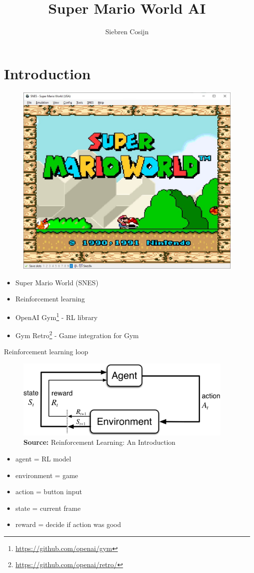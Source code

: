 \documentclass{article}
\title{Super Mario World AI}
\author{Siebren Cosijn}
\begin{document}
    \maketitle

    \section{Introduction}
    \begin{figure}[H]
        \centering
        \includegraphics[width=.85\textwidth]{start-screen}
    \end{figure}
    \begin{itemize}
        \item Super Mario World (SNES)
        \item Reinforcement learning
        \item OpenAI Gym\footnote{\url{https://github.com/openai/gym}} - RL library
        \item Gym Retro\footnote{\url{https://github.com/openai/retro/}} - Game integration for Gym
    \end{itemize}
    Reinforcement learning loop
    \begin{figure}[H]
        \centering
        \includegraphics[width=0.95\textwidth]{loop}
        \caption{\textbf{Source:} Reinforcement Learning: An Introduction}
        \label{fig:loop}
    \end{figure}
    \begin{itemize}
        \item agent = RL model
        \item environment = game
        \item action = button input
        \item state = current frame
        \item reward = decide if action was good
    \end{itemize}
\end{document}
